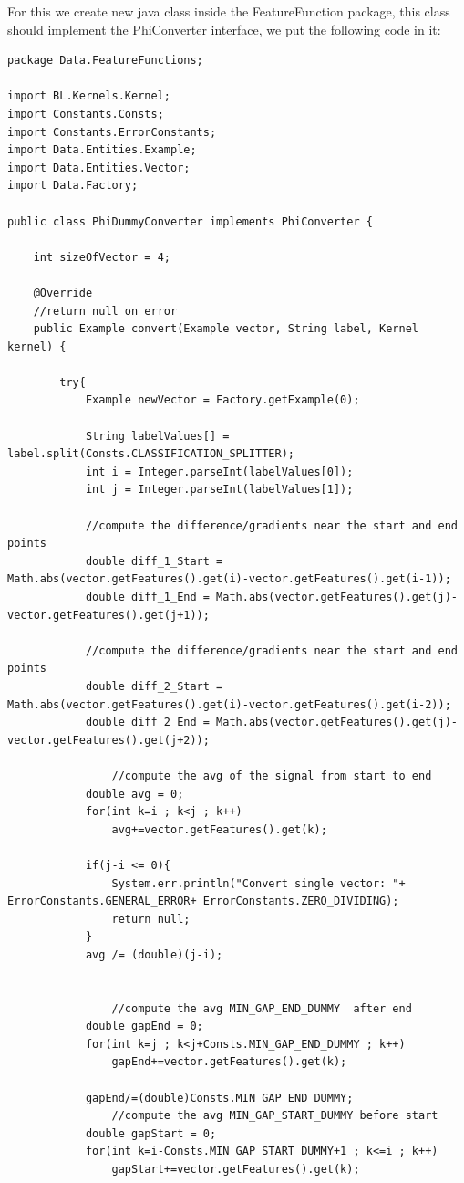\documentclass[11pt, oneside]{article}   	%
\begin{document}
For this we create new java class inside the FeatureFunction package, this class should implement the PhiConverter interface, we put the following code in it:
\begin{lstlisting}
package Data.FeatureFunctions;

import BL.Kernels.Kernel;
import Constants.Consts;
import Constants.ErrorConstants;
import Data.Entities.Example;
import Data.Entities.Vector;
import Data.Factory;

public class PhiDummyConverter implements PhiConverter {

    int sizeOfVector = 4;

	@Override
	//return null on error
	public Example convert(Example vector, String label, Kernel kernel) {

        try{
            Example newVector = Factory.getExample(0);

            String labelValues[] = label.split(Consts.CLASSIFICATION_SPLITTER);
            int i = Integer.parseInt(labelValues[0]);
            int j = Integer.parseInt(labelValues[1]);

            //compute the difference/gradients near the start and end points
            double diff_1_Start = Math.abs(vector.getFeatures().get(i)-vector.getFeatures().get(i-1));
            double diff_1_End = Math.abs(vector.getFeatures().get(j)-vector.getFeatures().get(j+1));

            //compute the difference/gradients near the start and end points
            double diff_2_Start = Math.abs(vector.getFeatures().get(i)-vector.getFeatures().get(i-2));
            double diff_2_End = Math.abs(vector.getFeatures().get(j)-vector.getFeatures().get(j+2));

	    		//compute the avg of the signal from start to end
            double avg = 0;
            for(int k=i ; k<j ; k++)
                avg+=vector.getFeatures().get(k);

            if(j-i <= 0){
                System.err.println("Convert single vector: "+ ErrorConstants.GENERAL_ERROR+ ErrorConstants.ZERO_DIVIDING);
                return null;
            }
            avg /= (double)(j-i);


				//compute the avg MIN_GAP_END_DUMMY  after end
            double gapEnd = 0;
            for(int k=j ; k<j+Consts.MIN_GAP_END_DUMMY ; k++)
                gapEnd+=vector.getFeatures().get(k);

            gapEnd/=(double)Consts.MIN_GAP_END_DUMMY;
				//compute the avg MIN_GAP_START_DUMMY before start
            double gapStart = 0;
            for(int k=i-Consts.MIN_GAP_START_DUMMY+1 ; k<=i ; k++)
                gapStart+=vector.getFeatures().get(k);


\end{lstlisting}
\end{document}
